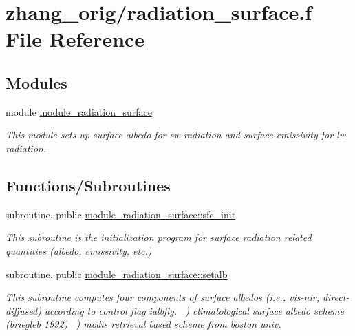 \hypertarget{zhang__orig_2radiation__surface_8f}{}\section{zhang\+\_\+orig/radiation\+\_\+surface.f File Reference}
\label{zhang__orig_2radiation__surface_8f}
\subsection*{Modules}
\begin{DoxyCompactItemize}
\item 
module \hyperlink{namespacemodule__radiation__surface}{module\+\_\+radiation\+\_\+surface}
\begin{DoxyCompactList}\small\item\em This module sets up surface albedo for sw radiation and surface emissivity for lw radiation. \end{DoxyCompactList}\end{DoxyCompactItemize}
\subsection*{Functions/\+Subroutines}
\begin{DoxyCompactItemize}
\item 
subroutine, public \hyperlink{group__module__radiation__surface_ga498f81178239045860c84680f3622362}{module\+\_\+radiation\+\_\+surface\+::sfc\+\_\+init}
\begin{DoxyCompactList}\small\item\em This subroutine is the initialization program for surface radiation related quantities (albedo, emissivity, etc.) \end{DoxyCompactList}\end{DoxyCompactItemize}
{\bf }\par
\begin{DoxyCompactItemize}
\item 
subroutine, public \hyperlink{group__module__radiation__surface_ga9b989fb8c2f3e384c3cf15c1b2470dc6}{module\+\_\+radiation\+\_\+surface\+::setalb}
\begin{DoxyCompactList}\small\item\em This subroutine computes four components of surface albedos (i.\+e., vis-\/nir, direct-\/diffused) according to control flag ialbflg. ~) climatological surface albedo scheme (briegleb 1992) ~) modis retrieval based scheme from boston univ. \end{DoxyCompactList}\end{DoxyCompactItemize}


